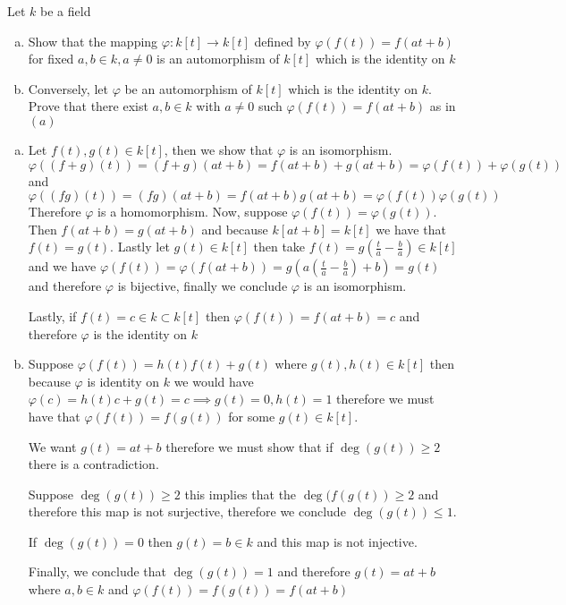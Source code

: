 \begin{exercise}
    Let $k$ be a field
    \begin{enumerate}[(a)]
        \item Show that the mapping $\varphi:k[t]\to k[t]$ defined by $\varphi(f(t))=f(at + b)$ for fixed $a, b \in k, a \neq 0$ is an automorphism of $k[t]$ which is the identity on $k$
        
        \item Conversely, let $\varphi$ be an automorphism of $k[t]$ which is the identity on $k$. Prove that there exist $a, b \in k$ with $a \neq 0$ such $\varphi(f(t)) = f(at + b)$ as in $(a)$
    \end{enumerate}
\end{exercise}
\begin{solution}
    \begin{enumerate}[(a)]%
        \item Let $f(t), g(t) \in k[t]$, then we show that $\varphi$ is an isomorphism. 
        \[\varphi((f+g)(t)) = (f + g)(at + b) = f(at + b) + g(at + b) = \varphi(f(t)) + \varphi(g(t))\]
        and 
        \[\varphi((fg)(t)) = (fg)(at + b) = f(at + b)g(at+b) = \varphi(f(t))\varphi(g(t))\]
        Therefore $\varphi$ is a homomorphism.
        Now, suppose $\varphi(f(t))=\varphi(g(t))$. Then $f(at + b)=g(at + b)$ and because $k[at + b] = k[t]$ we have that $f(t)=g(t)$. Lastly let $g(t) \in k[t]$ then take $f(t) = g(\frac{t}{a} - \frac{b}{a}) \in k[t]$ and we have $\varphi(f(t)) = \varphi(f(at+b)) = g(a(\frac{t}{a}-\frac{b}{a}) + b) = g(t)$ and therefore $\varphi$ is bijective, finally we conclude $\varphi$ is an isomorphism.

        Lastly, if $f(t) = c \in k \subset k[t]$ then $\varphi(f(t)) = f(at + b) = c$ and therefore $\varphi$ is the identity on $k$
        \item Suppose $\varphi(f(t)) = h(t)f(t) + g(t)$ where $g(t), h(t) \in k[t]$ then because $\varphi$ is identity on $k$ we would have $\varphi(c) = h(t)c + g(t) = c \implies g(t) = 0, h(t) = 1$ therefore we must have that $\varphi(f(t)) = f(g(t))$ for some $g(t) \in k[t]$. 
        
        We want $g(t) = at + b$ therefore we must show that if $\deg(g(t)) \geq 2$ there is a contradiction.
        
        Suppose $\deg(g(t)) \geq 2$ this implies that the $\deg(f(g(t)) \geq 2$ and therefore this map is not surjective, therefore we conclude $\deg(g(t)) \leq 1$.
        
        If $\deg(g(t)) = 0$ then $g(t) = b \in k$ and this map is not injective.
        
        Finally, we conclude that $\deg(g(t)) = 1$ and therefore $g(t) = at + b$ where $a, b \in k$ and $\varphi(f(t)) = f(g(t)) = f(at+b)$
     \end{enumerate}
\end{solution}

